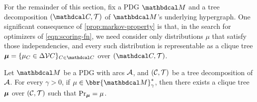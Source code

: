 \documentclass[twoside]{article}
\begin{document}
For the remainder of this section, fix a PDG $\dg M$ and a tree decomposition $(\mathdcal C, \mathcal T)$ of $\dg M$'s underlying hypergraph.
One significant consequence of \cref{prop:markov-property} is that, in the
search for optimizers of \eqref{eqn:scoring-fn}, we
need consider only distributions $\mu$ that satisfy those independencies,
and every such distribution is representable as a clique tree
$\bmu = \{\mu_C \in \Delta\V C \}_{C \in \mathdcal C}$
over $(\mathdcal C, \mathcal T)$.

\begin{coro}
    Let $\dg M$ be a PDG with arcs $\mathcal A$, and
    $(\cal C, T)$ be a tree decomposition of $\mathcal A$.
    For every $\gamma > 0$, if
    $\mu \in \bbr{\dg M}^*_\gamma$, then there exists a clique tree
    $\boldsymbol\mu$ over $(\cal C, T)$ such that $\Pr_{\boldsymbol\mu} = \mu$.
\end{coro}
\end{document}
